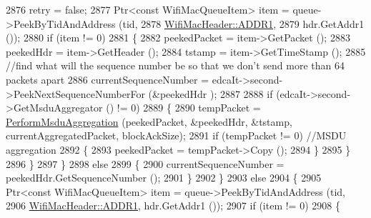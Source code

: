 \begin{DoxyCode}
2876                           retry = \textcolor{keyword}{false};
2877                           Ptr<const WifiMacQueueItem> item = queue->PeekByTidAndAddress (tid,
2878                                                                                          
      \hyperlink{classns3_1_1WifiMacHeader_a17406db48973a8e8fb6d961dd35154fea8ff9765c77ab96f3bbc7385ece3d00bf}{WifiMacHeader::ADDR1},
2879                                                                                          hdr.GetAddr1 ());
2880                           \textcolor{keywordflow}{if} (item != 0)
2881                             \{
2882                               peekedPacket = item->GetPacket ();
2883                               peekedHdr = item->GetHeader ();
2884                               tstamp = item->GetTimeStamp ();
2885                               \textcolor{comment}{//find what will the sequence number be so that we don't send more than 64
       packets apart}
2886                               currentSequenceNumber = edcaIt->second->PeekNextSequenceNumberFor (&peekedHdr
      );
2887 
2888                               \textcolor{keywordflow}{if} (edcaIt->second->GetMsduAggregator () != 0)
2889                                 \{
2890                                   tempPacket = \hyperlink{classns3_1_1MacLow_aabd112b43fd3be901c743b21d41f787f}{PerformMsduAggregation} (peekedPacket, 
      &peekedHdr, &tstamp, currentAggregatedPacket, blockAckSize);
2891                                   \textcolor{keywordflow}{if} (tempPacket != 0) \textcolor{comment}{//MSDU aggregation}
2892                                     \{
2893                                       peekedPacket = tempPacket->Copy ();
2894                                     \}
2895                                 \}
2896                             \}
2897                         \}
2898                       \textcolor{keywordflow}{else}
2899                         \{
2900                           currentSequenceNumber = peekedHdr.GetSequenceNumber ();
2901                         \}
2902                     \}
2903                   \textcolor{keywordflow}{else}
2904                     \{
2905                       Ptr<const WifiMacQueueItem> item = queue->PeekByTidAndAddress (tid,
2906                                                                  
      \hyperlink{classns3_1_1WifiMacHeader_a17406db48973a8e8fb6d961dd35154fea8ff9765c77ab96f3bbc7385ece3d00bf}{WifiMacHeader::ADDR1}, hdr.GetAddr1 ());
2907                       \textcolor{keywordflow}{if} (item != 0)
2908                         \{

\end{DoxyCode}
